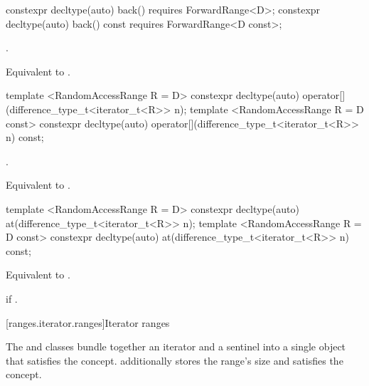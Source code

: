 %
\begin{itemdecl}
constexpr decltype(auto) back() requires ForwardRange<D>;
constexpr decltype(auto) back() const requires ForwardRange<D const>;
\end{itemdecl}

\begin{itemdescr}
\pnum
\requires {}.

\pnum
\returns Equivalent to .
\end{itemdescr}

%
\begin{itemdecl}
template <RandomAccessRange R = D>
constexpr decltype(auto) operator[](difference_type_t<iterator_t<R>> n);
template <RandomAccessRange R = D const>
constexpr decltype(auto) operator[](difference_type_t<iterator_t<R>> n) const;
\end{itemdecl}

\begin{itemdescr}
\pnum
\requires {}.

\pnum
\returns Equivalent to .
\end{itemdescr}

%
\begin{itemdecl}
template <RandomAccessRange R = D>
constexpr decltype(auto) at(difference_type_t<iterator_t<R>> n);
template <RandomAccessRange R = D const>
constexpr decltype(auto) at(difference_type_t<iterator_t<R>> n) const;
\end{itemdecl}

\begin{itemdescr}
\pnum
\returns Equivalent to .

\pnum
\throws {} if .
\end{itemdescr}



[ranges.iterator.ranges]{Iterator ranges}

\pnum
The  and  classes bundle together an
iterator and a sentinel into a single object that satisfies the  concept.
 additionally stores the range's size and satisfies the
 concept.

